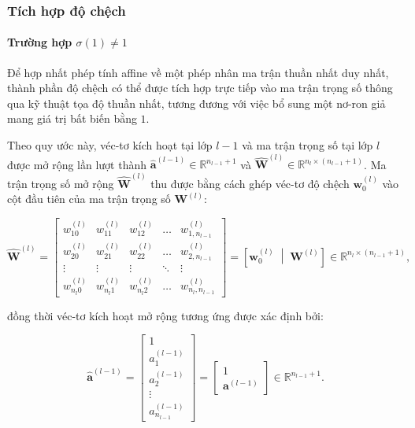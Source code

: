 \subsubsection{Tích hợp độ chệch}
\paragraph{Trường hợp $\sigma(1) \neq 1$\\}

Để hợp nhất phép tính affine về một phép nhân ma trận thuần nhất duy nhất, thành phần độ chệch có thể được tích hợp trực tiếp vào ma trận trọng số thông qua kỹ thuật tọa độ thuần nhất, tương đương với việc bổ sung một nơ-ron giả mang giá trị bất biến bằng $1$.

Theo quy ước này, véc-tơ kích hoạt tại lớp $l-1$ và ma trận trọng số tại lớp $l$ được mở rộng lần lượt thành $\hat{\mathbf{a}}^{(l-1)} \in \mathbb{R}^{n_{l-1} + 1}$ và $\hat{\mathbf{W}}^{(l)} \in \mathbb{R}^{n_l \times (n_{l-1} + 1)}$. 
Ma trận trọng số mở rộng $\hat{\mathbf{W}}^{(l)}$ thu được bằng cách ghép véc-tơ độ chệch $\mathbf{w}_0^{(l)}$ vào cột đầu tiên của ma trận trọng số $\mathbf{W}^{(l)}$:

\begin{equation}
    \hat{\mathbf{W}}^{(l)} = \begin{bmatrix}
        w_{10}^{(l)} & w_{11}^{(l)} & w_{12}^{(l)} & \dots & w_{1, n_{l-1}}^{(l)} \\
        w_{20}^{(l)} & w_{21}^{(l)} & w_{22}^{(l)} & \dots & w_{2, n_{l-1}}^{(l)} \\
        \vdots & \vdots & \vdots & \ddots & \vdots \\
        w_{n_l 0}^{(l)} & w_{n_l 1}^{(l)} & w_{n_l 2}^{(l)} & \dots & w_{n_l, n_{l-1}}^{(l)}
    \end{bmatrix} = \left[ \mathbf{w}_0^{(l)} \;\middle|\; \mathbf{W}^{(l)} \right] \in \mathbb{R}^{n_l \times (n_{l-1} + 1)},
\end{equation}

đồng thời véc-tơ kích hoạt mở rộng tương ứng được xác định bởi:

\begin{equation}
    \hat{\mathbf{a}}^{(l-1)} = \begin{bmatrix} 
        1 \\ 
        a_1^{(l-1)} \\ 
        a_2^{(l-1)} \\ 
        \vdots \\ 
        a_{n_{l-1}}^{(l-1)} 
    \end{bmatrix} = \begin{bmatrix} 1 \\ \mathbf{a}^{(l-1)} \end{bmatrix} \in \mathbb{R}^{n_{l-1} + 1}.
\end{equation}

